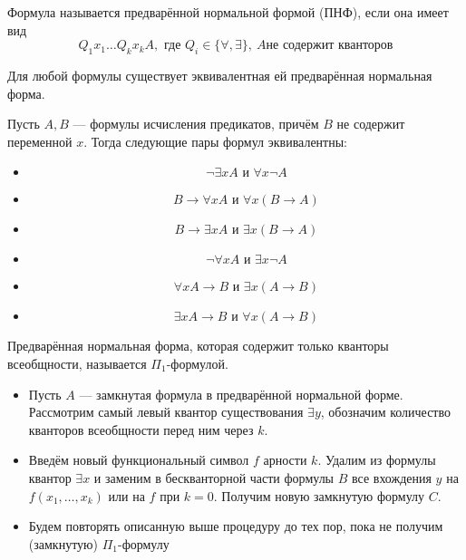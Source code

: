 \documentclass[11pt]{article}
\begin{document}
\begin{definition}
    Формула называется предварённой нормальной формой (ПНФ), если она имеет вид
    \[Q_1 x_1 \dots Q_k x_k A, \text{ где } Q_i \in \{\forall, \exists\}, \ A 
    \text{не содержит кванторов}\]
\end{definition}

\begin{remark}
    Для любой формулы существует эквивалентная ей предварённая нормальная форма.
\end{remark}

\begin{remark}
    Пусть $A, B$ — формулы исчисления предикатов, причём $B$ не содержит переменной
    $x$. Тогда следующие пары формул эквивалентны:
    \begin{itemize}
        \item \[ \lnot \exists x A \text{ и } \forall x \lnot A\]
        \item \[B \to \forall x A \text{ и } \forall x (B \to A)\]
        \item \[B \to \exists x A \text{ и } \exists x(B \to A)\]   
        \item \[\lnot \forall x A \text{ и } \exists x \lnot A\]   
        \item \[\forall x A \to B \text{ и } \exists x(A \to B)\]   
        \item \[\exists x A \to B \text{ и } \forall x (A \to B)\]
    \end{itemize}
\end{remark}

\begin{definition}
    Предварённая нормальная форма, которая содержит только кванторы
всеобщности, называется $\Pi_1$-формулой.
\end{definition}

\begin{itemize}
    \item Пусть $A$ — замкнутая формула в предварённой нормальной форме. \\
    Рассмотрим самый левый квантор существования $\exists y$, обозначим количество
    кванторов всеобщности перед ним через $k$.
    \item Введём новый функциональный символ $f$ арности $k$. Удалим из формулы
    квантор $\exists x$ и заменим в бескванторной части формулы $B$ все вхождения 
    $y$ на $f(x_1, \dots, x_k)$ или на $f$ при $k = 0$. Получим новую замкнутую формулу $C$.
    \item Будем повторять описанную выше процедуру до тех пор, пока не получим
    (замкнутую) $\Pi_1$-формулу
\end{itemize}
\end{document}
